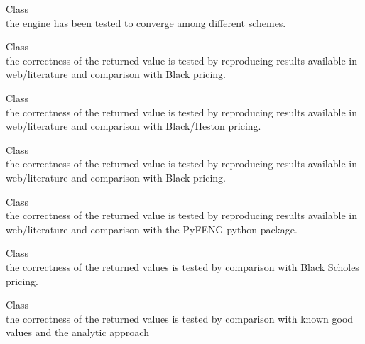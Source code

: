 \begin{DoxyRefList}
\item[Class \doxylink{class_quant_lib_1_1_fd_c_i_r_vanilla_engine}{Quant\+Lib\+::Fd\+CIRVanilla\+Engine} ]\hfill \\
\label{test__test000151}%
%
the engine has been tested to converge among different schemes.  
\item[Class \doxylink{class_quant_lib_1_1_fd_heston_barrier_engine}{Quant\+Lib\+::Fd\+Heston\+Barrier\+Engine} ]\hfill \\
\label{test__test000108}%
%
the correctness of the returned value is tested by reproducing results available in web/literature and comparison with Black pricing.  
\item[Class \doxylink{class_quant_lib_1_1_fd_heston_hull_white_vanilla_engine}{Quant\+Lib\+::Fd\+Heston\+Hull\+White\+Vanilla\+Engine} ]\hfill \\
\label{test__test000152}%
%
the correctness of the returned value is tested by reproducing results available in web/literature and comparison with Black/\+Heston pricing.  
\item[Class \doxylink{class_quant_lib_1_1_fd_heston_vanilla_engine}{Quant\+Lib\+::Fd\+Heston\+Vanilla\+Engine} ]\hfill \\
\label{test__test000153}%
%
the correctness of the returned value is tested by reproducing results available in web/literature and comparison with Black pricing.  
\item[Class \doxylink{class_quant_lib_1_1_fdndim_black_scholes_vanilla_engine}{Quant\+Lib\+::Fdndim\+Black\+Scholes\+Vanilla\+Engine} ]\hfill \\
\label{test__test000113}%
%
the correctness of the returned value is tested by reproducing results available in web/literature and comparison with the Py\+FENG python package.  
\item[Class \doxylink{class_quant_lib_1_1_f_f_t_vanilla_engine}{Quant\+Lib\+::FFTVanilla\+Engine} ]\hfill \\
\label{test__test000014}%
%
the correctness of the returned values is tested by comparison with Black Scholes pricing.  
\item[Class \doxylink{class_quant_lib_1_1_f_f_t_variance_gamma_engine}{Quant\+Lib\+::FFTVariance\+Gamma\+Engine} ]\hfill \\
\label{test__test000015}%
%
the correctness of the returned values is tested by comparison with known good values and the analytic approach  

\end{DoxyRefList}
